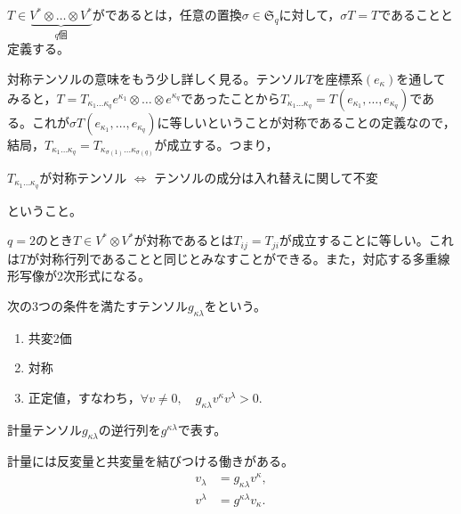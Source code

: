 \documentclass[uplatex]{jsarticle}
\begin{document}
\begin{teigi}[対称テンソル]
  $T \in \underbrace{V^{*} \otimes \dots \otimes V^{*}}_{q\text{個}}$がであるとは，任意の置換$\sigma \in \mathfrak{S}_{q}$に対して，$\sigma T = T$であることと定義する。
\end{teigi}

対称テンソルの意味をもう少し詳しく見る。テンソル$T$を座標系$(e_{\kappa})$を通してみると，$T = T_{\kappa_{1} \dots \kappa_{q}} e^{\kappa_{1}} \otimes \dots \otimes e^{\kappa_{q}}$であったことから$T_{\kappa_{1} \dots \kappa_{q}} = T(e_{\kappa_{1}}, \dots, e_{\kappa_{q}})$である。これが$\sigma T (e_{\kappa_{1}}, \dots, e_{\kappa_{q}})$に等しいということが対称であることの定義なので，結局，$T_{\kappa_{1} \dots \kappa_{q}} = T_{\kappa_{\sigma(1)}\dots \kappa_{\sigma(q)}}$が成立する。つまり，
\begin{center}
  $T_{\kappa_{1}\dots\kappa_{q}}$が対称テンソル $\iff$ テンソルの成分は入れ替えに関して不変
\end{center}
ということ。

\begin{rei}
  $q = 2$のとき$T \in V^{*} \otimes V^{*}$が対称であるとは$T_{ij} = T_{ji}$が成立することに等しい。これは$T$が対称行列であることと同じとみなすことができる。また，対応する多重線形写像が2次形式になる。
\end{rei}


\sukima{}\par
\begin{teigi}[計量テンソル]
  次の3つの条件を満たすテンソル$g_{\kappa\lambda}$をという。
  \begin{enumerate}
    \item 共変2価
    \item 対称
    \item 正定値，すなわち，$\forall v \neq 0, \quad g_{\kappa\lambda}v^{\kappa}v^{\lambda} > 0.$
  \end{enumerate}
\end{teigi}

\begin{teigi}
  計量テンソル$g_{\kappa\lambda}$の逆行列を$g^{\kappa\lambda}$で表す。
\end{teigi}

\begin{remark}
  計量には反変量と共変量を結びつける働きがある。
  \begin{align}
    v_{\lambda} &= g_{\kappa \lambda} v^{\kappa}, \\
    v^{\lambda} &= g^{\kappa \lambda} v_{\kappa}.
  \end{align}
\end{remark}
\end{document}
